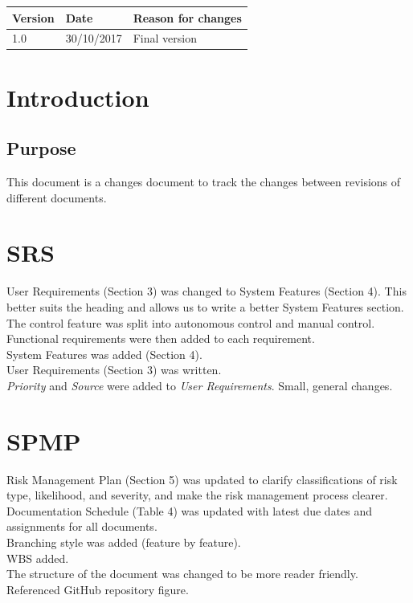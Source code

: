 \documentclass[12pt,a4paper]{article}
\begin{document}
	\newpage
	
	\tableofcontents
   	\vspace{80px}
	\begin{center}
	\begin{tabular}{ |p{2cm}|p{3cm}|p{9cm}|  }
	\hline
	\rowcolor{lightgray}
	Version & Date &Reason for changes \\
    \hline
	1.0 & 30/10/2017 &Final version \\
	\hline
	\end{tabular}
	\end{center}
    
    \vspace{50px}
	\vspace{50px}
    
	\section{Introduction}
	\subsection{Purpose}
This document is a changes document to track the changes between revisions of different documents.

\newpage
\section{SRS}
User Requirements (Section 3) was changed to System Features (Section 4). This better suits the heading and allows us to write a better System Features section. The control feature was split into autonomous control and manual control. Functional requirements were then added to each requirement. \\
System Features was added (Section 4).\\
User Requirements (Section 3) was written.\\
\textit{Priority} and \textit{Source} were added to \textit{User Requirements}.
Small, general changes.

\section{SPMP}
Risk Management Plan (Section 5) was updated to clarify classifications of risk type, likelihood, and severity, and make the risk management process clearer.\\
Documentation Schedule (Table 4) was updated with latest due dates and assignments for all documents.\\
Branching style was added (feature by feature).\\
WBS added.\\
The structure of the document was changed to be more reader friendly.\\
Referenced GitHub repository figure.\\
\end{document}
